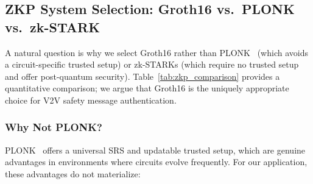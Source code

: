 \subsection{ZKP System Selection: Groth16 vs.\ PLONK vs.\ zk-STARK}
\label{sec:zkp_selection}

A natural question is why we select Groth16 rather than PLONK~\cite{gabizon2019plonk}
(which avoids a circuit-specific trusted setup) or zk-STARKs (which require no
trusted setup and offer post-quantum security). Table~\ref{tab:zkp_comparison}
provides a quantitative comparison; we argue that Groth16 is the uniquely
appropriate choice for V2V safety message authentication.

\begin{table}[t]
\centering
\caption{ZKP System Comparison for V2V Safety Message Authentication
(BN254, depth-16 circuit, $\sim$9{,}100 constraints)}
\label{tab:zkp_comparison}
\end{table}

\subsubsection{Why Not PLONK?}

PLONK~\cite{gabizon2019plonk} offers a universal SRS and updatable trusted setup,
which are genuine advantages in environments where circuits evolve frequently. For
our application, these advantages do not materialize:

